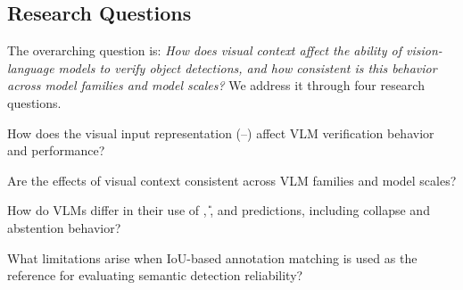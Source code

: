 \subsection{Research Questions}
\label{sec:intro:rqs}
The overarching question is: \emph{How does visual context affect the ability
of vision-language models to verify object detections, and how consistent is
this behavior across model families and model scales?} We address it through
four research questions.

\begin{description}[leftmargin=2.2em,style=nextline]
  \item[RQ1] How does the visual input representation (--)
    affect VLM verification behavior and performance?
  \item[RQ2] Are the effects of visual context consistent across VLM families
    and model scales?
  \item[RQ3] How do VLMs differ in their use of \R{}, \U{}, and \Ur{}
    predictions, including collapse and abstention behavior?
  \item[RQ4] What limitations arise when IoU-based annotation matching is
    used as the reference for evaluating semantic detection reliability?
\end{description}


